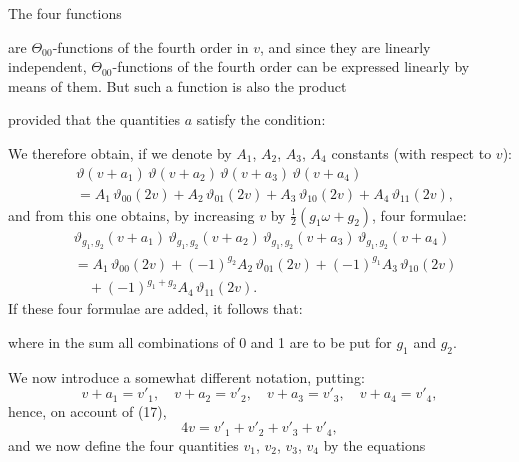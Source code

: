 
The four functions

are $\Theta_{00}$-functions of the fourth order in $v$, and since they are linearly independent,  $\Theta_{00}$-functions of the fourth order can be expressed linearly by means of them. But such a function is also the product

provided that the quantities $a$ satisfy the condition:

We therefore obtain, if we denote by $A_1$, $A_2$, $A_3$, $A_4$ constants (with respect to $v$):
\[
\begin{aligned}
&\vartheta(v+a_1)\,\vartheta(v+a_2)\,\vartheta(v+a_3)\,\vartheta(v+a_4) \\
&{}= A_1\,\vartheta_{00}(2v) + A_2\,\vartheta_{01}(2v) + A_3\,\vartheta_{10}(2v) + A_4\,\vartheta_{11}(2v),
\end{aligned}
\]
and from this one obtains, by increasing $v$ by $\frac{1}{2}(g_1\omega+g_2)$, four formulae:
\[
\begin{aligned}
&\vartheta_{g_1,g_2}(v+a_1)\,\vartheta_{g_1,g_2}(v+a_2)\,\vartheta_{g_1,g_2}(v+a_3)\,\vartheta_{g_1,g_2}(v+a_4) \\
&{}= A_1\,\vartheta_{00}(2v) + (-1)^{g_2}A_2\,\vartheta_{01}(2v) + (-1)^{g_1}A_3\,\vartheta_{10}(2v) \\
&\quad{}+ (-1)^{g_1+g_2}A_4\,\vartheta_{11}(2v).
\end{aligned}
\]
If these four formulae are added, it follows that:

where in the sum all combinations of 0 and 1 are to be put for $g_1$ and $g_2$.

We now introduce a somewhat different notation, putting:
\[
v+a_1 = v'_1, \quad v+a_2 = v'_2, \quad v+a_3 = v'_3, \quad v+a_4 = v'_4,
\]
hence, on account of (17),
\[
4v = v'_1 + v'_2 + v'_3 + v'_4,
\]
and we now define the four quantities $v_1$, $v_2$, $v_3$, $v_4$ by the equations

